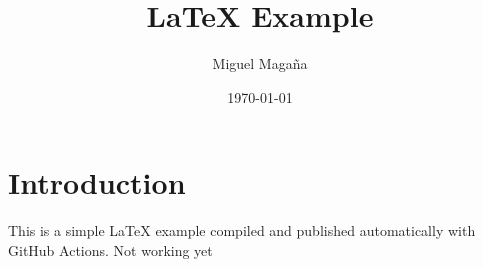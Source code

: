 \documentclass{article}
\title{LaTeX Example}
\author{Miguel Magaña}
\date{\today}
\begin{document}
\maketitle

\section{Introduction}

This is a simple \LaTeX{} example compiled and published automatically with GitHub Actions.
Not working yet
\end{document}
